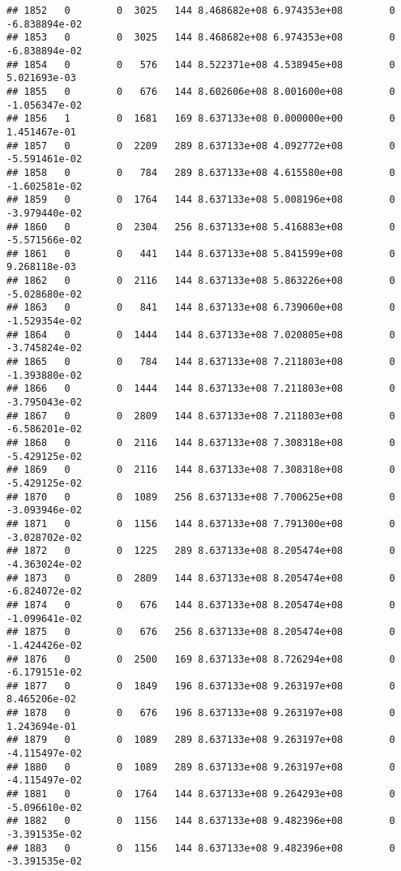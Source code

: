\documentclass[
]{article}
\begin{document}
\begin{enumerate}
\begin{verbatim}
## 1852   0        0  3025   144 8.468682e+08 6.974353e+08        0 -6.838894e-02
## 1853   0        0  3025   144 8.468682e+08 6.974353e+08        0 -6.838894e-02
## 1854   0        0   576   144 8.522371e+08 4.538945e+08        0  5.021693e-03
## 1855   0        0   676   144 8.602606e+08 8.001600e+08        0 -1.056347e-02
## 1856   1        0  1681   169 8.637133e+08 0.000000e+00        0  1.451467e-01
## 1857   0        0  2209   289 8.637133e+08 4.092772e+08        0 -5.591461e-02
## 1858   0        0   784   289 8.637133e+08 4.615580e+08        0 -1.602581e-02
## 1859   0        0  1764   144 8.637133e+08 5.008196e+08        0 -3.979440e-02
## 1860   0        0  2304   256 8.637133e+08 5.416883e+08        0 -5.571566e-02
## 1861   0        0   441   144 8.637133e+08 5.841599e+08        0  9.268118e-03
## 1862   0        0  2116   144 8.637133e+08 5.863226e+08        0 -5.028680e-02
## 1863   0        0   841   144 8.637133e+08 6.739060e+08        0 -1.529354e-02
## 1864   0        0  1444   144 8.637133e+08 7.020805e+08        0 -3.745824e-02
## 1865   0        0   784   144 8.637133e+08 7.211803e+08        0 -1.393880e-02
## 1866   0        0  1444   144 8.637133e+08 7.211803e+08        0 -3.795043e-02
## 1867   0        0  2809   144 8.637133e+08 7.211803e+08        0 -6.586201e-02
## 1868   0        0  2116   144 8.637133e+08 7.308318e+08        0 -5.429125e-02
## 1869   0        0  2116   144 8.637133e+08 7.308318e+08        0 -5.429125e-02
## 1870   0        0  1089   256 8.637133e+08 7.700625e+08        0 -3.093946e-02
## 1871   0        0  1156   144 8.637133e+08 7.791300e+08        0 -3.028702e-02
## 1872   0        0  1225   289 8.637133e+08 8.205474e+08        0 -4.363024e-02
## 1873   0        0  2809   144 8.637133e+08 8.205474e+08        0 -6.824072e-02
## 1874   0        0   676   144 8.637133e+08 8.205474e+08        0 -1.099641e-02
## 1875   0        0   676   256 8.637133e+08 8.205474e+08        0 -1.424426e-02
## 1876   0        0  2500   169 8.637133e+08 8.726294e+08        0 -6.179151e-02
## 1877   0        0  1849   196 8.637133e+08 9.263197e+08        0  8.465206e-02
## 1878   0        0   676   196 8.637133e+08 9.263197e+08        0  1.243694e-01
## 1879   0        0  1089   289 8.637133e+08 9.263197e+08        0 -4.115497e-02
## 1880   0        0  1089   289 8.637133e+08 9.263197e+08        0 -4.115497e-02
## 1881   0        0  1764   144 8.637133e+08 9.264293e+08        0 -5.096610e-02
## 1882   0        0  1156   144 8.637133e+08 9.482396e+08        0 -3.391535e-02
## 1883   0        0  1156   144 8.637133e+08 9.482396e+08        0 -3.391535e-02

\end{verbatim}
\end{enumerate}
\end{document}
